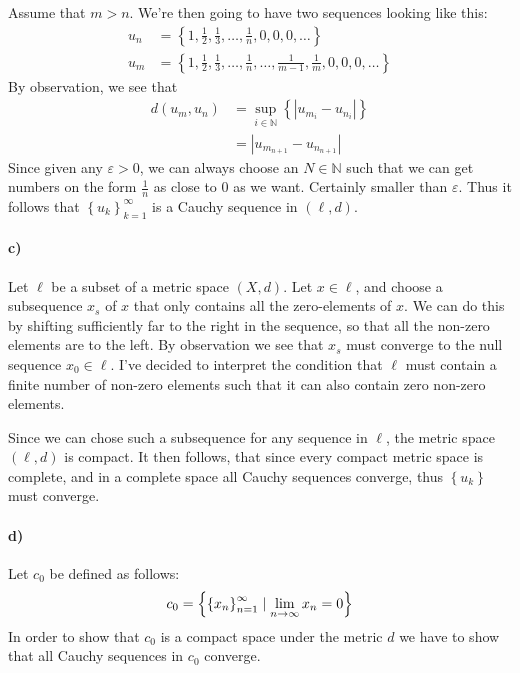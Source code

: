 \documentclass[a4paper]{article}
\theoremstyle{plain}
\begin{document}
Assume that $m > n$. We're then going to have two sequences looking like this:
\begin{align*}
  \label{eq:}
  u_n &= \left\{ 1, \frac{1}{2}, \frac{1}{3},  \dots , \frac{1}{n}, 0, 0, 0, \dots \right\} \\
  u_m &= \left\{ 1, \frac{1}{2}, \frac{1}{3},  \dots,  \frac{1}{n}, \dots, \frac{1}{m-1}, \frac{1}{m}, 0, 0, 0, \dots \right\}
\end{align*}
By observation, we see that
\begin{align*}
  d(u_m, u_n) &= \sup_{i\in\mathbb{N}}\left\{ \left|u_{m_{i}} - u_{n_{i}} \right|\right\} \\
  &= \left|u_{m_{n+1}} - u_{n_{n+1}}\right|
\end{align*}
Since given any $\varepsilon > 0$, we can always choose an $N \in \mathbb{N}$
such that we can get numbers on the form $\frac{1}{n}$ as close to $0$ as we
want. Certainly smaller than $\varepsilon$.  Thus it follows that $\left\{ u_k
\right\}_{k=1}^{\infty}$ is a Cauchy sequence in $\left( \ell, d \right).$

\paragraph{c)}

Let $\ell$ be a subset of a metric space $\left( X, d \right)$.  Let $x \in
\ell$, and choose a subsequence $x_s$ of $x$ that only contains all the
zero-elements of $x$. We can do this by shifting sufficiently far to the right
in the sequence, so that all the non-zero elements are to the left.  By
observation we see that $x_s$ must converge to the null sequence $x_0 \in
\ell$.  I've decided to interpret the condition that $\ell$ must contain a
finite number of non-zero elements such that it can also contain zero non-zero
elements. 

Since we can chose such a subsequence for any sequence in $\ell$, the metric
space $\left( \ell, d \right)$ is compact. It then follows, that since every compact metric space is complete, and
in a complete space all Cauchy sequences converge, thus $\left\{ u_k \right\}$ must converge.

\paragraph{d)}

Let $c_0$ be defined as follows:
\begin{equation}
  \notag
  c_{0} = \left\{ \left\{ x_n \right\}_{n=1}^{\infty} \mid \lim\limits_{n\rightarrow\infty} x_{n} = 0 \right\}
\end{equation}
In order to show that $c_0$ is a compact space under the metric $d$ we have to
show that all Cauchy sequences in $c_0$ converge.  
\end{document}
